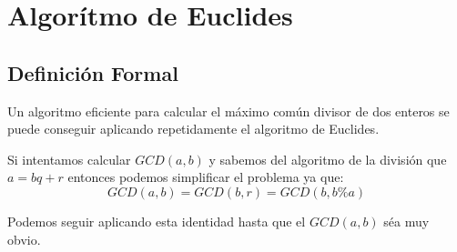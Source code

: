 \documentclass[12pt]{report}                                    %
\begin{document}
    \clearpage
    \section{Algorítmo de Euclides}

        \subsection*{Definición Formal}

            Un algoritmo eficiente para calcular el máximo común divisor de dos enteros
            se puede conseguir aplicando repetidamente el algoritmo de Euclides.

            Si intentamos calcular $GCD(a,b)$ y sabemos del algoritmo de la división 
            que $a=bq+r$ entonces podemos simplificar el problema ya que:
            \begin{equation}
                GCD(a,b) = GCD(b,r) = GCD(b, b\%a)
            \end{equation}

            Podemos seguir aplicando esta identidad hasta que el $GCD(a, b)$ séa muy
            obvio.
\end{document}
